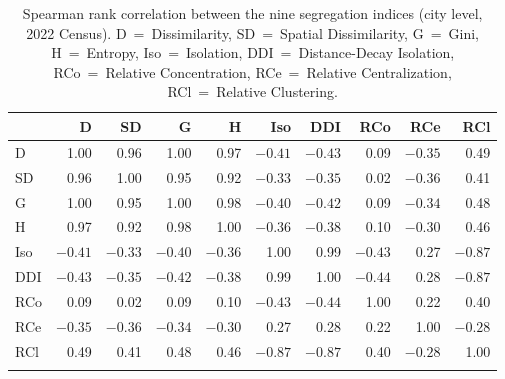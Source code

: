 \begin{table}[h]
\caption{Spearman rank correlation between the nine segregation indices (city level, 2022 Census). D~=~Dissimilarity, SD~=~Spatial Dissimilarity, G~=~Gini, H~=~Entropy, Iso~=~Isolation, DDI~=~Distance-Decay Isolation, RCo~=~Relative Concentration, RCe~=~Relative Centralization, RCl~=~Relative Clustering.}\label{tab:corr}%
\footnotesize
\setlength{\tabcolsep}{4.5pt}
\begin{tabular}{@{}lrrrrrrrrr@{}}
\toprule
 & D & SD & G & H & Iso & DDI & RCo & RCe & RCl \\
\midrule
D   & 1.00 & 0.96 & 1.00 & 0.97 & $-0.41$ & $-0.43$ & 0.09 & $-0.35$ & 0.49 \\
SD  & 0.96 & 1.00 & 0.95 & 0.92 & $-0.33$ & $-0.35$ & 0.02 & $-0.36$ & 0.41 \\
G   & 1.00 & 0.95 & 1.00 & 0.98 & $-0.40$ & $-0.42$ & 0.09 & $-0.34$ & 0.48 \\
H   & 0.97 & 0.92 & 0.98 & 1.00 & $-0.36$ & $-0.38$ & 0.10 & $-0.30$ & 0.46 \\
Iso & $-0.41$ & $-0.33$ & $-0.40$ & $-0.36$ & 1.00 & 0.99 & $-0.43$ & 0.27 & $-0.87$ \\
DDI & $-0.43$ & $-0.35$ & $-0.42$ & $-0.38$ & 0.99 & 1.00 & $-0.44$ & 0.28 & $-0.87$ \\
RCo & 0.09 & 0.02 & 0.09 & 0.10 & $-0.43$ & $-0.44$ & 1.00 & 0.22 & 0.40 \\
RCe & $-0.35$ & $-0.36$ & $-0.34$ & $-0.30$ & 0.27 & 0.28 & 0.22 & 1.00 & $-0.28$ \\
RCl & 0.49 & 0.41 & 0.48 & 0.46 & $-0.87$ & $-0.87$ & 0.40 & $-0.28$ & 1.00 \\
\botrule
\end{tabular}
\end{table}
